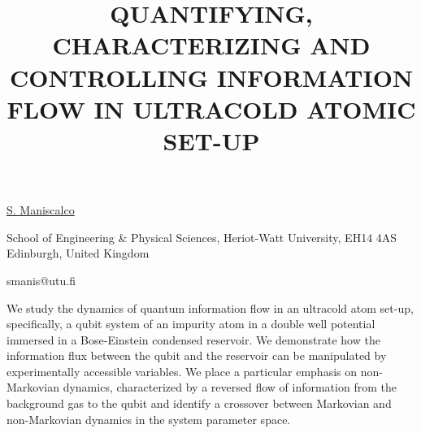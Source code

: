 \title{QUANTIFYING, CHARACTERIZING AND CONTROLLING INFORMATION FLOW IN ULTRACOLD ATOMIC SET-UP}

\underline{S. Maniscalco} 

{\normalsize{\vspace{-4mm}
School of Engineering \& Physical Sciences, Heriot-Watt University, EH14 4AS Edinburgh, United Kingdom

\email smanis@utu.fi}}

We study the dynamics of quantum information flow in an ultracold atom set-up, specifically, a
qubit system of an impurity atom in a double well potential immersed in a Bose-Einstein condensed
reservoir. We demonstrate how the information flux between the qubit and the reservoir can be manipulated
by experimentally accessible variables. We place a particular emphasis on non-Markovian
dynamics, characterized by a reversed flow of information from the background gas to the qubit
and identify a crossover between Markovian and non-Markovian dynamics in the system parameter
space.

\vspace{\baselineskip} 